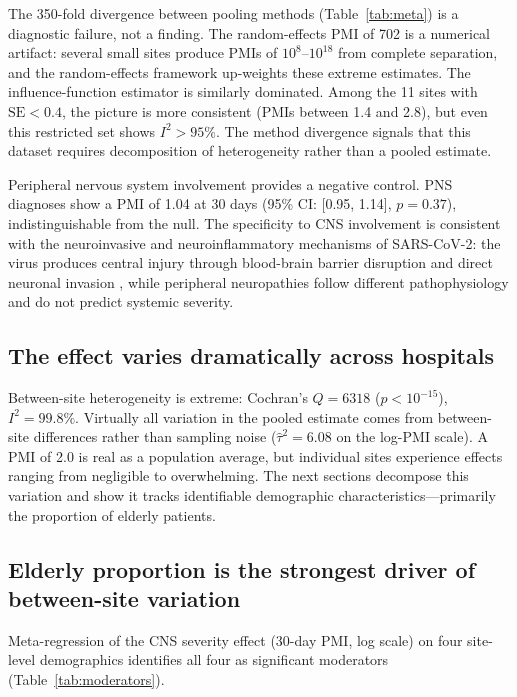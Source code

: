 \documentclass{article}
\begin{document}
The 350-fold divergence between pooling methods (Table~\ref{tab:meta}) is a diagnostic failure, not a finding.
The random-effects PMI of 702 is a numerical artifact: several small sites produce PMIs of $10^{8}$--$10^{18}$ from complete separation, and the random-effects framework up-weights these extreme estimates.
The influence-function estimator is similarly dominated.
Among the 11 sites with $\text{SE} < 0.4$, the picture is more consistent (PMIs between 1.4 and 2.8), but even this restricted set shows $I^2 > 95\%$.
The method divergence signals that this dataset requires decomposition of heterogeneity rather than a pooled estimate.

Peripheral nervous system involvement provides a negative control.
PNS diagnoses show a PMI of 1.04 at 30 days (95\% CI: [0.95, 1.14], $p = 0.37$), indistinguishable from the null.
The specificity to CNS involvement is consistent with the neuroinvasive and neuroinflammatory mechanisms of SARS-CoV-2: the virus produces central injury through blood-brain barrier disruption and direct neuronal invasion \cite{song2021neuroinvasion, iadecola2020covid}, while peripheral neuropathies follow different pathophysiology and do not predict systemic severity.


\subsection{The effect varies dramatically across hospitals}

Between-site heterogeneity is extreme: Cochran's $Q = 6318$ ($p < 10^{-15}$), $I^2 = 99.8\%$.
Virtually all variation in the pooled estimate comes from between-site differences rather than sampling noise ($\hat\tau^2 = 6.08$ on the log-PMI scale).
A PMI of 2.0 is real as a population average, but individual sites experience effects ranging from negligible to overwhelming.
The next sections decompose this variation and show it tracks identifiable demographic characteristics---primarily the proportion of elderly patients.


\subsection{Elderly proportion is the strongest driver of between-site variation}

Meta-regression of the CNS severity effect (30-day PMI, log scale) on four site-level demographics identifies all four as significant moderators (Table~\ref{tab:moderators}).
\end{document}
